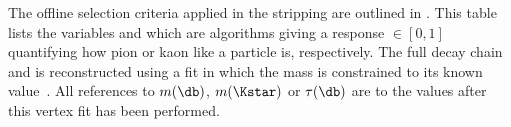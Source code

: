 

The offline selection criteria applied in the stripping are outlined in .
This table lists the variables \ProbNN{\pi} and  which are \MVA algorithms
giving a response $\in[0,1]$ quantifying how pion or kaon like a particle is, respectively.
The full decay chain \btokstrdb and \dbtomumu is reconstructed using a fit in which the \Bd mass is
constrained to its known value~\cite{PDG2014}.
All references to $m(\db)$, $m(\Kstar)$ or $\tau(\db)$ are to the values after this vertex fit
has been performed.

